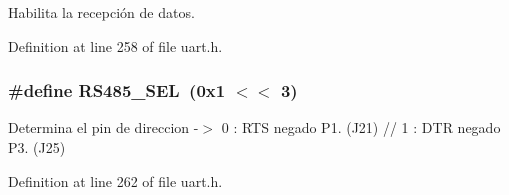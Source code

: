 Habilita la recepción de datos. 



Definition at line 258 of file uart.\+h.

\subsubsection[{\texorpdfstring{R\+S485\+\_\+\+S\+EL}{RS485_SEL}}]{\setlength{\rightskip}{0pt plus 5cm}\#define R\+S485\+\_\+\+S\+EL~(0x1 $<$$<$ 3)}\hypertarget{group___r_s485_m_o_d_e_gaab560420636565a39ce5ddc3539438b3}{}\label{group___r_s485_m_o_d_e_gaab560420636565a39ce5ddc3539438b3}


Determina el pin de direccion -\/$>$ 0 \+: R\+TS negado P1. (J21) // 1 \+: D\+TR negado P3. (J25) 



Definition at line 262 of file uart.\+h.

